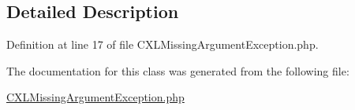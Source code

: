 \subsection{Detailed Description}


Definition at line 17 of file CXLMissingArgumentException.php.



The documentation for this class was generated from the following file:\begin{DoxyCompactItemize}
\item 
\hyperlink{CXLMissingArgumentException_8php}{CXLMissingArgumentException.php}\end{DoxyCompactItemize}
